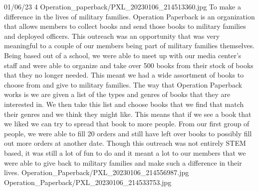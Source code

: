 {01/06/23}
{4}
{Operation_paperback/PXL_20230106_214513360.jpg}
{To make a difference in the lives of military families.}
{Operation Paperback is an organization that allows members to collect books and send those books to military families and deployed officers. This outreach was an opportunity that was very meaningful to a couple of our members being part of military families themselves. Being based out of a school, we were able to meet up with our media center’s staff and were able to organize and take over 500 books from their stock of books that they no longer needed. This meant we had a wide assortment of books to choose from and give to military families. The way that Operation Paperback works is we are given a list of the types and genres of books that they are interested in. We then take this list and choose books that we find that match their genres and we think they might like. This means that if we see a book that we liked we can try to spread that book to more people. From our first group of people, we were able to fill 20 orders and still have left over books to possibly fill out more orders at another date. Though this outreach was not entirely STEM based, it was still a lot of fun to do and it meant a lot to our members that we were able to give back to military families and make such a difference in their lives. 
} 
{Operation_Paperback/PXL_20230106_214556987.jpg}
{Operation_Paperback/PXL_20230106_214533753.jpg}
